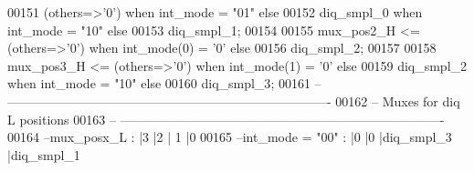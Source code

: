 \begin{DoxyCode}
00151                \textcolor{vhdlchar}{(}\textcolor{keywordflow}{others}\textcolor{vhdlchar}{=}\textcolor{vhdlchar}{>}\textcolor{vhdlchar}{'}\textcolor{vhdllogic}{}\textcolor{vhdllogic}{0}\textcolor{vhdlchar}{'}\textcolor{vhdlchar}{)}  \textcolor{keywordflow}{when} \textcolor{vhdlchar}{int_mode} \textcolor{vhdlchar}{=} \textcolor{vhdllogic}{"01"} \textcolor{keywordflow}{else} 
00152                \textcolor{vhdlchar}{diq_smpl_0}     \textcolor{keywordflow}{when} \textcolor{vhdlchar}{int_mode} \textcolor{vhdlchar}{=} \textcolor{vhdllogic}{"10"} \textcolor{keywordflow}{else} 
00153                \textcolor{vhdlchar}{diq_smpl_1};
00154                
00155 \textcolor{vhdlchar}{mux_pos2_H} \textcolor{vhdlchar}{<=}  \textcolor{vhdlchar}{(}\textcolor{keywordflow}{others}\textcolor{vhdlchar}{=}\textcolor{vhdlchar}{>}\textcolor{vhdlchar}{'}\textcolor{vhdllogic}{}\textcolor{vhdllogic}{0}\textcolor{vhdlchar}{'}\textcolor{vhdlchar}{)}  \textcolor{keywordflow}{when} \textcolor{vhdlchar}{int_mode}\textcolor{vhdlchar}{(}\textcolor{vhdllogic}{}\textcolor{vhdllogic}{0}\textcolor{vhdlchar}{)} \textcolor{vhdlchar}{=} \textcolor{vhdlchar}{'}\textcolor{vhdllogic}{}\textcolor{vhdllogic}{0}\textcolor{vhdlchar}{'} \textcolor{keywordflow}{else} 
00156                \textcolor{vhdlchar}{diq_smpl_2};               
00157                   
00158 \textcolor{vhdlchar}{mux_pos3_H} \textcolor{vhdlchar}{<=}  \textcolor{vhdlchar}{(}\textcolor{keywordflow}{others}\textcolor{vhdlchar}{=}\textcolor{vhdlchar}{>}\textcolor{vhdlchar}{'}\textcolor{vhdllogic}{}\textcolor{vhdllogic}{0}\textcolor{vhdlchar}{'}\textcolor{vhdlchar}{)}  \textcolor{keywordflow}{when} \textcolor{vhdlchar}{int_mode}\textcolor{vhdlchar}{(}\textcolor{vhdllogic}{}\textcolor{vhdllogic}{1}\textcolor{vhdlchar}{)} \textcolor{vhdlchar}{=} \textcolor{vhdlchar}{'}\textcolor{vhdllogic}{}\textcolor{vhdllogic}{0}\textcolor{vhdlchar}{'} \textcolor{keywordflow}{else} 
00159                \textcolor{vhdlchar}{diq_smpl_2}     \textcolor{keywordflow}{when} \textcolor{vhdlchar}{int_mode} \textcolor{vhdlchar}{=} \textcolor{vhdllogic}{"10"} \textcolor{keywordflow}{else} 
00160                \textcolor{vhdlchar}{diq_smpl_3};
00161 \textcolor{keyword}{-- ----------------------------------------------------------------------------               }
00162 \textcolor{keyword}{-- Muxes for diq  L positions}
00163 \textcolor{keyword}{-- ----------------------------------------------------------------------------}
00164 \textcolor{keyword}{--mux\_posx\_L      : |3            |2          | 1         |0           }
00165 \textcolor{keyword}{--int\_mode = "00" : |0            |0          |diq\_smpl\_3 |diq\_smpl\_1}

\end{DoxyCode}
